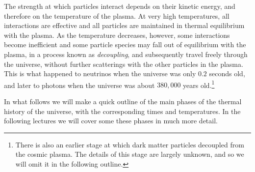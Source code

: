 The strength at which particles interact depends on their kinetic energy, and therefore on the temperature of the plasma. At very high temperatures, all interactions are effective and all particles are maintained in thermal equilibrium with the plasma. As the temperature decreases, however, some interactions become inefficient and some particle species may fall out of equilibrium with the plasma, in a process known as {\it decoupling}, and subsequently travel freely through the universe, without further scatterings with the other particles in the plasma. This is what happened to neutrinos when the universe was only $0.2$ seconds old, and later to photons when the universe was about $380,000$ years old.\footnote{There is also an earlier stage at which dark matter particles decoupled from the cosmic plasma. The details of this stage are largely unknown, and so we will omit it in the following outline.}

In what follows we will make a quick outline of the main phases of the thermal history of the universe, with the corresponding times and temperatures. In the following lectures we will cover some these phases in much more detail.

